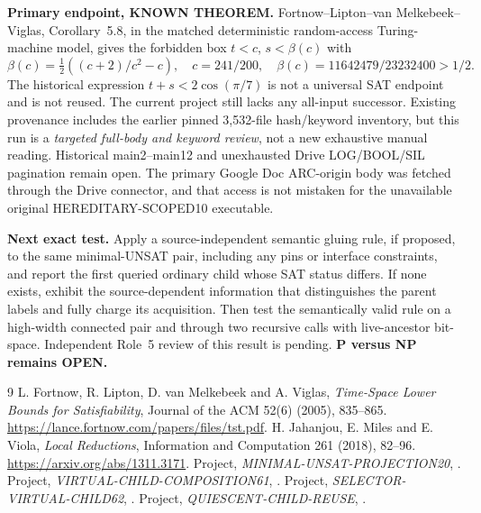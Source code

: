 \documentclass[11pt]{article}
\begin{document}
\noindent\textbf{Primary endpoint, KNOWN THEOREM.}
Fortnow--Lipton--van Melkebeek--Viglas, Corollary~5.8,
in the matched deterministic random-access Turing-machine model,
gives the forbidden box $t<c$, $s<\beta(c)$ with
\[
\beta(c)=\tfrac12((c+2)/c^2-c),\quad
c=241/200,\quad
\beta(c)=11642479/23232400>1/2.
\]
The historical expression $t+s<2\cos(\pi/7)$ is not
a universal SAT endpoint and is not reused.
The current project still lacks any all-input successor.
Existing provenance includes the earlier pinned
3,532-file hash/keyword inventory, but this run is a
\emph{targeted full-body and keyword review}, not a new
exhaustive manual reading. Historical main2--main12 and
unexhausted Drive LOG/BOOL/SIL pagination remain open.
The primary Google Doc ARC-origin body was fetched through
the Drive connector, and that access is not mistaken for
the unavailable original HEREDITARY-SCOPED10 executable.

\noindent\textbf{Next exact test.}
Apply a source-independent semantic gluing rule, if proposed,
to the same minimal-UNSAT pair, including any pins or
interface constraints, and report the first queried ordinary
child whose SAT status differs. If none exists, exhibit the
source-dependent information that distinguishes the parent
labels and fully charge its acquisition. Then test the
semantically valid rule on a high-width connected pair and
through two recursive calls with live-ancestor bit-space.
Independent Role~5 review of this result is pending.
\textbf{P versus NP remains OPEN.}

\begin{thebibliography}{9}
 L. Fortnow, R. Lipton, D. van Melkebeek and
A. Viglas, \emph{Time-Space Lower Bounds for Satisfiability},
Journal of the ACM 52(6) (2005), 835--865.
\url{https://lance.fortnow.com/papers/files/tst.pdf}.
 H. Jahanjou, E. Miles and E. Viola,
\emph{Local Reductions}, Information and Computation 261 (2018),
82--96. \url{https://arxiv.org/abs/1311.3171}.
 Project, \emph{MINIMAL-UNSAT-PROJECTION20},
.
 Project, \emph{VIRTUAL-CHILD-COMPOSITION61},
.
 Project, \emph{SELECTOR-VIRTUAL-CHILD62},
.
 Project, \emph{QUIESCENT-CHILD-REUSE},
.
\end{thebibliography}
\end{document}
